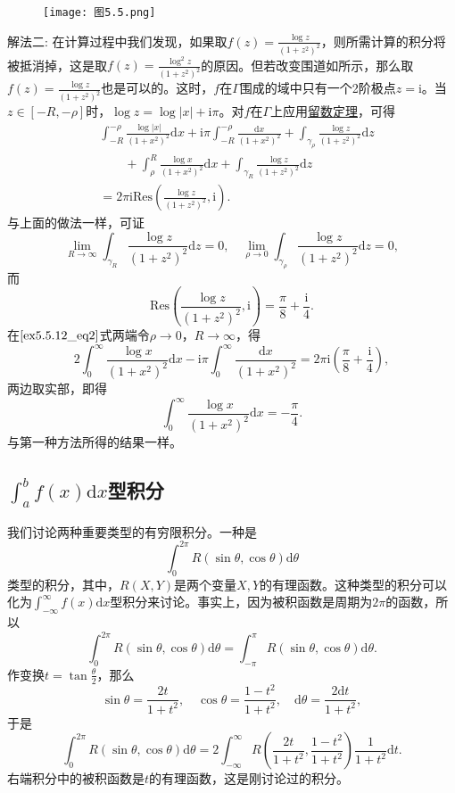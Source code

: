 \documentclass[../../main.tex]{subfiles}
\begin{document}
\begin{solution}
\begin{figure}[H]
\centering
\texttt{[image: 图5.5.png]}
\caption{}
\label{figure:图5.5}
\end{figure}
{\color{blue}解法二:}
在计算过程中我们发现，如果取\( f(z) = \frac{\log z}{(1 + z^2)^2} \)，则所需计算的积分将被抵消掉，这是取\( f(z) = \frac{\log^2 z}{(1 + z^2)^2} \)的原因。但若改变围道如所示，那么取\( f(z) = \frac{\log z}{(1 + z^2)^2} \)也是可以的。这时，\( f \)在\( \Gamma \)围成的域中只有一个2阶极点\( z = \mathrm{i} \)。当\( z \in [-R, -\rho] \)时，\( \log z = \log|x| + \mathrm{i}\pi \)。对\( f \)在\( \Gamma \)上应用\hyperref[theorem:留数定理(残数定理)-定理5.4.9]{留数定理}，可得
\begin{align}
&\int_{-R}^{-\rho}{\frac{\log |x|}{(1+x^2)^2}\mathrm{d}x}+\mathrm{i}\pi \int_{-R}^{-\rho}{\frac{\mathrm{d}x}{(1+x^2)^2}}+\int_{\gamma _{\rho}}{\frac{\log z}{(1+z^2)^2}\mathrm{d}z}\nonumber
\\
&\quad \quad+\int_{\rho}^R{\frac{\log x}{(1+x^2)^2}\mathrm{d}x}+\int_{\gamma _R}{\frac{\log z}{(1+z^2)^2}\mathrm{d}z}\nonumber
\\
&=2\pi \mathrm{iRes}\left( \frac{\log z}{(1+z^2)^2},\mathrm{i} \right) . \label{ex5.5.12_eq2}
\end{align}
与上面的做法一样，可证
\[
\lim_{R \to \infty} \int_{\gamma_R} \frac{\log z}{(1 + z^2)^2} \mathrm{d}z = 0,
\quad
\lim_{\rho \to 0} \int_{\gamma_{\rho}} \frac{\log z}{(1 + z^2)^2} \mathrm{d}z = 0,
\]
而
\[
\mathrm{Res}\left( \frac{\log z}{(1 + z^2)^2}, \mathrm{i} \right) = \frac{\pi}{8} + \frac{\mathrm{i}}{4}.
\]
在\(\eqref{ex5.5.12_eq2}\)式两端令\( \rho \to 0 \)，\( R \to \infty \)，得
\[
2\int_{0}^{\infty} \frac{\log x}{(1 + x^2)^2} \mathrm{d}x - \mathrm{i}\pi \int_{0}^{\infty} \frac{\mathrm{d}x}{(1 + x^2)^2} = 2\pi \mathrm{i} \left( \frac{\pi}{8} + \frac{\mathrm{i}}{4} \right),
\]
两边取实部，即得
\[
\int_{0}^{\infty} \frac{\log x}{(1 + x^2)^2} \mathrm{d}x = -\frac{\pi}{4}.
\]
与第一种方法所得的结果一样。
\end{solution}

\subsection{$\int_a^b{f\left( x \right) \mathrm{d}x}$型积分}

我们讨论两种重要类型的有穷限积分。一种是
\[
\int_{0}^{2\pi} R(\sin\theta, \cos\theta) \mathrm{d}\theta
\]
类型的积分，其中，\( R(X, Y) \)是两个变量\( X, Y \)的有理函数。这种类型的积分可以化为\( \int_{-\infty}^{\infty} f(x) \mathrm{d}x \)型积分来讨论。事实上，因为被积函数是周期为\( 2\pi \)的函数，所以
\[
\int_{0}^{2\pi} R(\sin\theta, \cos\theta) \mathrm{d}\theta = \int_{-\pi}^{\pi} R(\sin\theta, \cos\theta) \mathrm{d}\theta.
\]
作变换\( t = \tan \frac{\theta}{2} \)，那么
\[
\sin\theta = \frac{2t}{1 + t^2},
\quad
\cos\theta = \frac{1 - t^2}{1 + t^2},
\quad
\mathrm{d}\theta = \frac{2\mathrm{d}t}{1 + t^2},
\]
于是
\[
\int_{0}^{2\pi} R(\sin\theta, \cos\theta) \mathrm{d}\theta = 2 \int_{-\infty}^{\infty} R\left( \frac{2t}{1 + t^2}, \frac{1 - t^2}{1 + t^2} \right) \frac{1}{1 + t^2} \mathrm{d}t.
\]
右端积分中的被积函数是\( t \)的有理函数，这是刚讨论过的积分。
\end{document}

